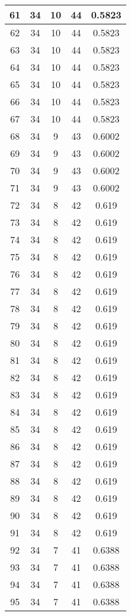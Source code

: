 \documentclass[letterpaper, 12pt]{article}
\begin{document}
\begin{longtable}{|c|c|c|c|c|}
\hline
61 & 34 & 10 & 44 & 0.5823 \\
\hline
62 & 34 & 10 & 44 & 0.5823 \\
\hline
63 & 34 & 10 & 44 & 0.5823 \\
\hline
64 & 34 & 10 & 44 & 0.5823 \\
\hline
65 & 34 & 10 & 44 & 0.5823 \\
\hline
66 & 34 & 10 & 44 & 0.5823 \\
\hline
67 & 34 & 10 & 44 & 0.5823 \\
\hline
68 & 34 & 9 & 43 & 0.6002 \\
\hline
69 & 34 & 9 & 43 & 0.6002 \\
\hline
70 & 34 & 9 & 43 & 0.6002 \\
\hline
71 & 34 & 9 & 43 & 0.6002 \\
\hline
72 & 34 & 8 & 42 & 0.619 \\
\hline
73 & 34 & 8 & 42 & 0.619 \\
\hline
74 & 34 & 8 & 42 & 0.619 \\
\hline
75 & 34 & 8 & 42 & 0.619 \\
\hline
76 & 34 & 8 & 42 & 0.619 \\
\hline
77 & 34 & 8 & 42 & 0.619 \\
\hline
78 & 34 & 8 & 42 & 0.619 \\
\hline
79 & 34 & 8 & 42 & 0.619 \\
\hline
80 & 34 & 8 & 42 & 0.619 \\
\hline
81 & 34 & 8 & 42 & 0.619 \\
\hline
82 & 34 & 8 & 42 & 0.619 \\
\hline
83 & 34 & 8 & 42 & 0.619 \\
\hline
84 & 34 & 8 & 42 & 0.619 \\
\hline
85 & 34 & 8 & 42 & 0.619 \\
\hline
86 & 34 & 8 & 42 & 0.619 \\
\hline
87 & 34 & 8 & 42 & 0.619 \\
\hline
88 & 34 & 8 & 42 & 0.619 \\
\hline
89 & 34 & 8 & 42 & 0.619 \\
\hline
90 & 34 & 8 & 42 & 0.619 \\
\hline
91 & 34 & 8 & 42 & 0.619 \\
\hline
92 & 34 & 7 & 41 & 0.6388 \\
\hline
93 & 34 & 7 & 41 & 0.6388 \\
\hline
94 & 34 & 7 & 41 & 0.6388 \\
\hline
95 & 34 & 7 & 41 & 0.6388 \\

\end{longtable}
\end{document}
